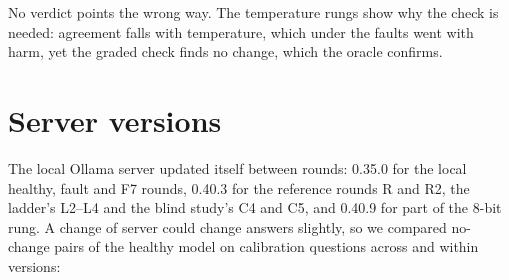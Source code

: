 \documentclass[11pt]{article}
\begin{document}
\begin{center}\small
\setlength{\tabcolsep}{3pt}
\end{center}

\noindent No verdict points the wrong way. The temperature rungs show why the check
is needed: agreement falls with temperature, which under the faults went with harm,
yet the graded check finds no change, which the oracle confirms.

\section{Server versions}
\label{app:server}

The local Ollama server updated itself between rounds: 0.35.0 for the local
healthy, fault and F7 rounds, 0.40.3 for the reference rounds R and R2, the ladder's
L2--L4 and the blind study's C4 and C5, and 0.40.9 for part of the 8-bit rung. A
change of server could change answers slightly, so we compared no-change pairs of
the healthy model on calibration questions across and within versions:
\end{document}
